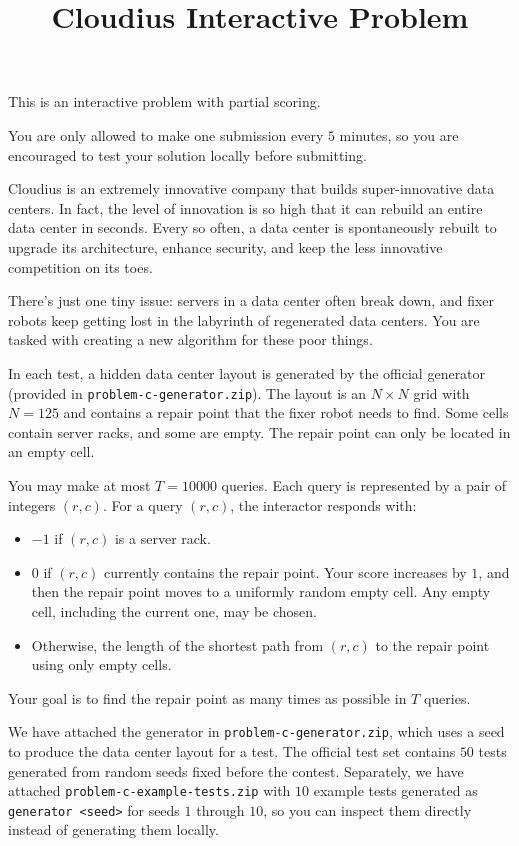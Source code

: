 \documentclass[11pt]{article}
\title{Cloudius Interactive Problem}
\date{}
\begin{document}
\maketitle

This is an interactive problem with partial scoring.

You are only allowed to make one submission every $5$ minutes, so you are encouraged to test your solution locally before submitting.

Cloudius is an extremely innovative company that builds super-innovative data centers. In fact, the level of innovation is so high that it can rebuild an entire data center in seconds. Every so often, a data center is spontaneously rebuilt to upgrade its architecture, enhance security, and keep the less innovative competition on its toes.

There's just one tiny issue: servers in a data center often break down, and fixer robots keep getting lost in the labyrinth of regenerated data centers. You are tasked with creating a new algorithm for these poor things.

In each test, a hidden data center layout is generated by the official generator (provided in \texttt{problem-c-generator.zip}). The layout is an $N \times N$ grid with $N = 125$ and contains a repair point that the fixer robot needs to find. Some cells contain server racks, and some are empty. The repair point can only be located in an empty cell.

You may make at most $T = 10000$ queries. Each query is represented by a pair of integers $(r,c)$. For a query $(r,c)$, the interactor responds with:
\begin{itemize}
    \item $-1$ if $(r,c)$ is a server rack.
    \item $0$ if $(r,c)$ currently contains the repair point. Your score increases by $1$, and then the repair point moves to a uniformly random empty cell. Any empty cell, including the current one, may be chosen.
    \item Otherwise, the length of the shortest path from $(r,c)$ to the repair point using only empty cells.
\end{itemize}

Your goal is to find the repair point as many times as possible in $T$ queries.

We have attached the generator in \texttt{problem-c-generator.zip}, which uses a seed to produce the data center layout for a test. The official test set contains $50$ tests generated from random seeds fixed before the contest. Separately, we have attached \texttt{problem-c-example-tests.zip} with $10$ example tests generated as \texttt{generator <seed>} for seeds $1$ through $10$, so you can inspect them directly instead of generating them locally.
\end{document}
